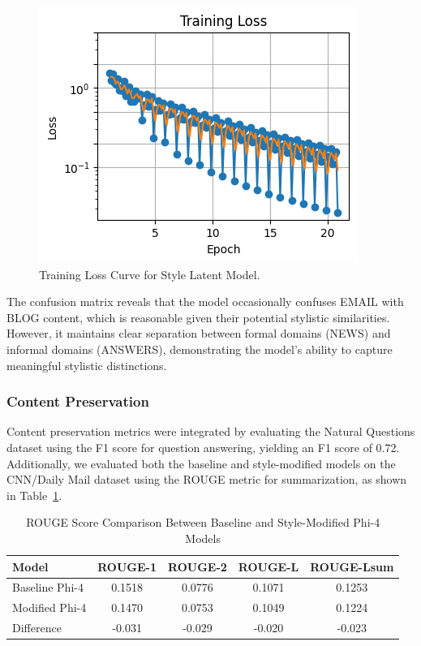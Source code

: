 \documentclass{article}
\begin{document}
\begin{figure}
    \centering
    \includegraphics[width=0.9\linewidth]{figures/training-loss2.png}
    \caption{Training Loss Curve for Style Latent Model.}
    \label{fig:training-loss}
\end{figure}

The confusion matrix reveals that the model occasionally confuses EMAIL with BLOG content, which is reasonable given their potential stylistic similarities. However, it maintains clear separation between formal domains (NEWS) and informal domains (ANSWERS), demonstrating the model's ability to capture meaningful stylistic distinctions.

\subsubsection{Content Preservation}
Content preservation metrics were integrated by evaluating the Natural Questions dataset using the F1 score for question answering, yielding an F1 score of 0.72. Additionally, we evaluated both the baseline and style-modified models on the CNN/Daily Mail dataset using the ROUGE metric for summarization, as shown in Table~\ref{tab:rouge-scores}.

\begin{table}[ht]
\centering
\caption{ROUGE Score Comparison Between Baseline and Style-Modified Phi-4 Models}
\label{tab:rouge-scores}
\begin{tabular}{lcccc}
\hline
\textbf{Model} & \textbf{ROUGE-1} & \textbf{ROUGE-2} & \textbf{ROUGE-L} & \textbf{ROUGE-Lsum} \\
\hline
Baseline Phi-4 & 0.1518 & 0.0776 & 0.1071 & 0.1253 \\
Modified Phi-4 & 0.1470 & 0.0753 & 0.1049 & 0.1224 \\
Difference  & -0.031 & -0.029 & -0.020 & -0.023 \\
\hline
\end{tabular}
\end{table}
\end{document}
